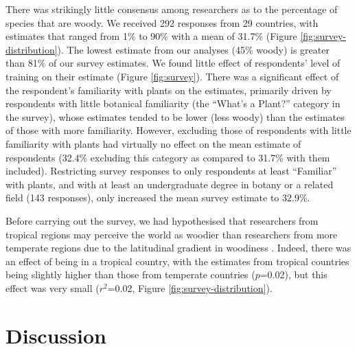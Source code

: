 \documentclass[a4paper,12pt]{article}
\begin{document}
There was strikingly little consensus among researchers as to the
percentage of species that are woody.  We received 292 responses from
29 countries, with estimates that ranged from 1\% to 90\% with a mean
of 31.7\% (Figure \ref{fig:survey-distribution}).  The lowest
estimate from our analyses (45\% woody) is greater than 81\% of our survey estimates.
We found little effect of respondents' level of training on their
estimate (Figure \ref{fig:survey}).  There was a significant effect of
the respondent's familiarity with plants on the estimates, primarily
driven by respondents with little botanical familiarity (the ``What's
a Plant?'' category in the survey), whose estimates tended to be lower (less woody)
than the estimates of those with more familiarity. However, excluding those of
respondents with little familiarity with plants had virtually no effect
on the mean estimate of respondents (32.4\% excluding this category as compared
to 31.7\% with them included).
Restricting survey responses to only respondents at least ``Familiar''
with plants, and with at least an undergraduate degree in botany or a
related field (143 responses), only increased the mean survey estimate
to 32.9\%.

Before carrying out the survey, we had hypothesised that researchers
from tropical regions may perceive the world as woodier than
researchers from more temperate regions due to the latitudinal
gradient in woodiness \citep{Molesheihgt}.
%
Indeed, there was an effect of being in a tropical country, with the
estimates from tropical countries being slightly higher than those
from temperate countries ($p$=0.02), but this effect was very small
($r^2$=0.02, Figure \ref{fig:survey-distribution}).

\section{Discussion}
\end{document}
